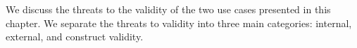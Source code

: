 \label{threats}

We discuss the threats to the validity of the two use cases presented in this chapter.
We separate the threats to validity into three main categories: internal, external, and construct validity.
